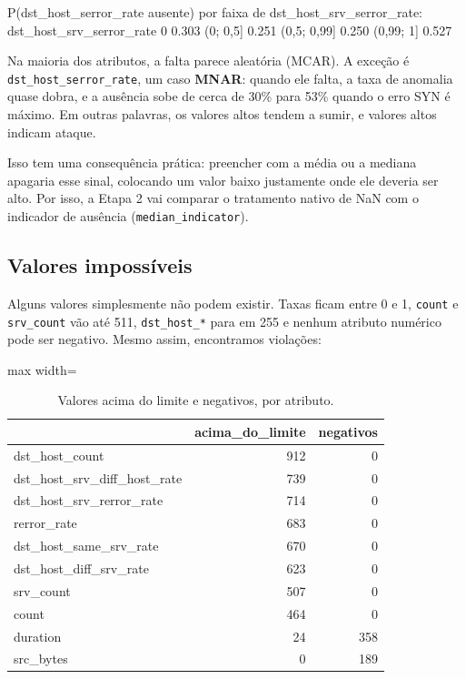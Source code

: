 \documentclass[11pt,a4paper]{article}
\begin{document}
\begin{saida}
P(dst_host_serror_rate ausente) por faixa de dst_host_srv_serror_rate:
dst_host_srv_serror_rate
0              0.303
(0; 0,5]       0.251
(0,5; 0,99]    0.250
(0,99; 1]      0.527
\end{saida}

Na maioria dos atributos, a falta parece aleatória (MCAR). A exceção é \texttt{dst\_host\_serror\_rate}, um caso \textbf{MNAR}: quando ele falta, a taxa de anomalia quase dobra, e a ausência sobe de cerca de 30\% para 53\% quando o erro SYN é máximo. Em outras palavras, os valores altos tendem a sumir, e valores altos indicam ataque.

Isso tem uma consequência prática: preencher com a média ou a mediana apagaria esse sinal, colocando um valor baixo justamente onde ele deveria ser alto. Por isso, a Etapa 2 vai comparar o tratamento nativo de NaN com o indicador de ausência (\texttt{median\_indicator}).

\subsection{Valores impossíveis}

Alguns valores simplesmente não podem existir. Taxas ficam entre 0 e 1, \texttt{count} e \texttt{srv\_count} vão até 511, \texttt{dst\_host\_*} para em 255 e nenhum atributo numérico pode ser negativo. Mesmo assim, encontramos violações:

\begin{table}[H]
\centering
\caption{Valores acima do limite e negativos, por atributo.}
\begin{adjustbox}{max width=\linewidth}
\begin{tabular}{lrr}
\toprule
 & acima\_do\_limite & negativos \\
\midrule
dst\_host\_count & 912 & 0 \\
dst\_host\_srv\_diff\_host\_rate & 739 & 0 \\
dst\_host\_srv\_rerror\_rate & 714 & 0 \\
rerror\_rate & 683 & 0 \\
dst\_host\_same\_srv\_rate & 670 & 0 \\
dst\_host\_diff\_srv\_rate & 623 & 0 \\
srv\_count & 507 & 0 \\
count & 464 & 0 \\
duration & 24 & 358 \\
src\_bytes & 0 & 189 \\
\bottomrule
\end{tabular}
\end{adjustbox}
\end{table}
\end{document}
